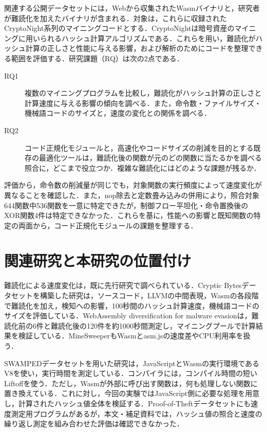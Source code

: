 \documentclass[submit,techrep]{ipsj}
\begin{document}
関連する公開データセットには，Webから収集されたWasmバイナリと，研究者が難読化を加えたバイナリが含まれる\cite{konoth2018,harnes2024,kim2025}．対象は，これらに収録されたCryptoNight系列のマイニングコードとする．CryptoNightは暗号資産のマイニングに用いられるハッシュ計算アルゴリズムである．これらを用い，難読化がハッシュ計算の正しさと性能に与える影響，および解析のためにコードを整理できる範囲を評価する．研究課題（RQ）は次の2点である．
\begin{description}
\item[RQ1] 複数のマイニングプログラムを比較し，難読化がハッシュ計算の正しさと計算速度に与える影響の傾向を調べる．また，命令数・ファイルサイズ・機械語コードのサイズと，速度の変化との関係を調べる．
\item[RQ2] コード正規化モジュールと，高速化やコードサイズの削減を目的とする既存の最適化ツールは，難読化後の関数が元のどの関数に当たるかを調べる照合に，どこまで役立つか．複雑な難読化にはどのような課題が残るか．
\end{description}

評価から，命令数の削減量が同じでも，対象関数の実行頻度によって速度変化が異なることを確認した．また，nop除去と定数畳み込みの併用により，照合対象644関数中536関数を一意に特定できたが，制御フロー平坦化・命令置換後のXOR関数4件は特定できなかった．これらを基に，性能への影響と既知関数の特定の両面から，コード正規化モジュールの課題を整理する．

\section{関連研究と本研究の位置付け}
難読化による速度変化は，既に先行研究で調べられている．Cryptic Bytesデータセットを構築した研究は，ソースコード，LLVMの中間表現，Wasmの各段階で難読化を加え，検知への影響，100秒間のハッシュ計算速度，機械語コードのサイズを評価している\cite{harnes2024}．WebAssembly diversification for malware evasionは，難読化前の6件と難読化後の120件を約1000秒間測定し，マイニングプールで計算結果を検証している\cite{cabrera2023}．MineSweeperもWasmとasm.jsの速度差やCPU利用率を扱う\cite{konoth2018}．

SWAMPEDデータセットを用いた研究は，JavaScriptとWasmの実行環境であるV8を使い，実行時間を測定している\cite{kim2025}．コンパイラには，コンパイル時間の短いLiftoffを使う．ただし，Wasmが外部に呼び出す関数は，何も処理しない関数に置き換えている．これに対し，今回の実験ではJavaScript側に必要な処理を用意し，計算されたハッシュ値全体を検証する．Proof-of-Theftデータセットにも速度測定用プログラムがあるが，本文・補足資料では，ハッシュ値の照合と速度の繰り返し測定を組み合わせた評価は確認できなかった\cite{sermchaiwong2026}．
\end{document}

